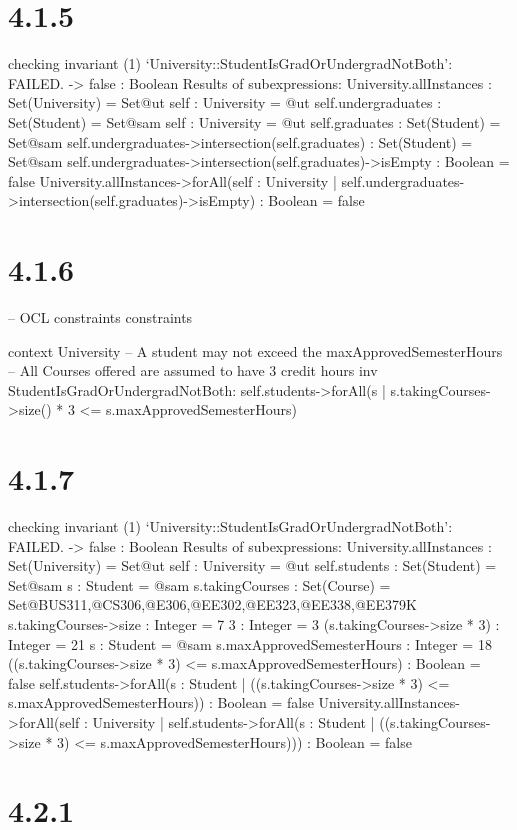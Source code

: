 \documentclass{article}
\begin{document}
  \section*{4.1.5}
  checking invariant (1) `University::StudentIsGradOrUndergradNotBoth': FAILED.
  -> false : Boolean
Results of subexpressions:
  University.allInstances : Set(University) = Set{@ut}
  self : University = @ut
  self.undergraduates : Set(Student) = Set{@sam}
  self : University = @ut
  self.graduates : Set(Student) = Set{@sam}
  self.undergraduates->intersection(self.graduates) : Set(Student) = Set{@sam}
  self.undergraduates->intersection(self.graduates)->isEmpty : Boolean = false
  University.allInstances->forAll(self : University | self.undergraduates->intersection(self.graduates)->isEmpty) : Boolean = false

 \section*{4.1.6}
-- OCL constraints
constraints

context University
    -- A student may not exceed the maxApprovedSemesterHours
	-- All Courses offered are assumed to have 3 credit hours
    inv StudentIsGradOrUndergradNotBoth:
       self.students->forAll(s | s.takingCourses->size() * 3 <= s.maxApprovedSemesterHours)

\section*{4.1.7}
 checking invariant (1) `University::StudentIsGradOrUndergradNotBoth': FAILED.
  -> false : Boolean
Results of subexpressions:
  University.allInstances : Set(University) = Set{@ut}
  self : University = @ut
  self.students : Set(Student) = Set{@sam}
  s : Student = @sam
  s.takingCourses : Set(Course) = Set{@BUS311,@CS306,@E306,@EE302,@EE323,@EE338,@EE379K}
  s.takingCourses->size : Integer = 7
  3 : Integer = 3
  (s.takingCourses->size * 3) : Integer = 21
  s : Student = @sam
  s.maxApprovedSemesterHours : Integer = 18
  ((s.takingCourses->size * 3) <= s.maxApprovedSemesterHours) : Boolean = false
  self.students->forAll(s : Student | ((s.takingCourses->size * 3) <= s.maxApprovedSemesterHours)) : Boolean = false
  University.allInstances->forAll(self : University | self.students->forAll(s : Student | ((s.takingCourses->size * 3) <= s.maxApprovedSemesterHours))) : Boolean = false
 
\section*{4.2.1}
\end{document}
